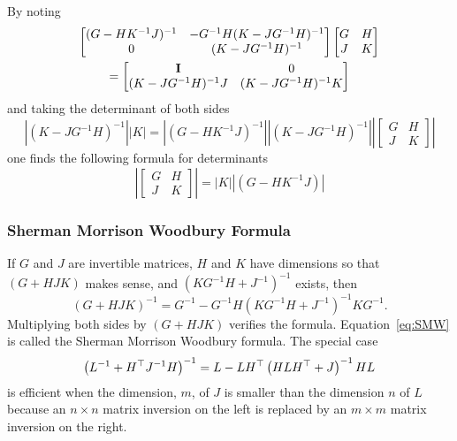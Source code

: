 By noting
\begin{multline*}
  \begin{bmatrix}
    (G-HK^{-1}J)^{-1} & -G^{-1}H(K-JG^{-1}H)^{-1} \\
    0 & (K-JG^{-1}H)^{-1}
  \end{bmatrix}
  \begin{bmatrix}
    G & H \\ J & K
  \end{bmatrix}\\
  =
  \begin{bmatrix}
    {\bf I} & 0 \\
     (K-JG^{-1}H)^{-1}J & (K-JG^{-1}H)^{-1} K
  \end{bmatrix}
\end{multline*}
and taking the determinant of both sides
\renewcommand{\det}[1]{\left| #1 \right|}
\begin{equation*}
  \det{(K-JG^{-1}H)^{-1}} \det{K} = \det{(G-HK^{-1}J)^{-1}}
  \det{(K-JG^{-1}H)^{-1}} \det{
  \begin{bmatrix}
    G & H \\ J & K
  \end{bmatrix}}
\end{equation*}
one finds the following formula for determinants
\begin{equation}
  \label{eq:BlockDet}
  \det{ \begin{bmatrix} G & H \\ J & K \end{bmatrix}} = \det{K}
  \det{(G-HK^{-1}J)}
\end{equation}
\subsubsection{Sherman Morrison Woodbury Formula}

If $G$ and $J$ are invertible matrices, $H$ and $K$ have dimensions so
that $\left( G + HJK \right)$ makes sense, and $\left(KG^{-1}H +
  J^{-1} \right)^{-1}$ exists, then
\begin{equation}
  \label{eq:SMW}
  \left( G + HJK \right)^{-1} = G^{-1} - G^{-1}H\left(KG^{-1}H +
  J^{-1}\right)^{-1}KG^{-1}.
\end{equation}
Multiplying both sides by $\left( G + HJK \right)$ verifies the
formula.  Equation~\eqref{eq:SMW} is called the Sherman Morrison
Woodbury formula.  The special case
\begin{equation}
  \label{eq:MatrixInversion}
  \left(L^{-1} + H^\top J^{-1}H \right)^{-1} = L - LH^\top
  \left( HLH^\top + J \right)^{-1}HL
\end{equation}
is efficient when the dimension, $m$, of $J$ is smaller than the
dimension $n$ of $L$ because an $n\times n$ matrix inversion on the
left is replaced by an $m \times m$ matrix inversion on the right.

